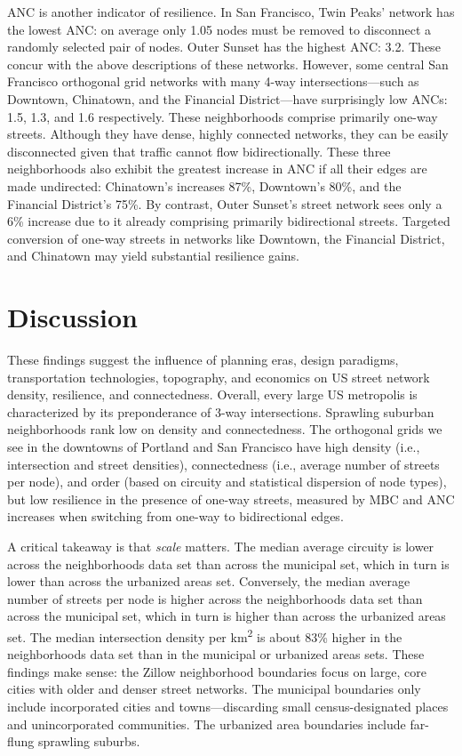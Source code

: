 \documentclass[Afour,sageh,times]{sagej}
\begin{document}
ANC is another indicator of resilience. In San Francisco, Twin Peaks' network has the lowest ANC: on average only 1.05 nodes must be removed to disconnect a randomly selected pair of nodes. Outer Sunset has the highest ANC: 3.2. These concur with the above descriptions of these networks. However, some central San Francisco orthogonal grid networks with many 4-way intersections---such as Downtown, Chinatown, and the Financial District---have surprisingly low ANCs: 1.5, 1.3, and 1.6 respectively. These neighborhoods comprise primarily one-way streets. Although they have dense, highly connected networks, they can be easily disconnected given that traffic cannot flow bidirectionally. These three neighborhoods also exhibit the greatest increase in ANC if all their edges are made undirected: Chinatown's increases 87\%, Downtown's 80\%, and the Financial District's 75\%. By contrast, Outer Sunset's street network sees only a 6\% increase due to it already comprising primarily bidirectional streets. Targeted conversion of one-way streets in networks like Downtown, the Financial District, and Chinatown may yield substantial resilience gains.



\section{Discussion}

These findings suggest the influence of planning eras, design paradigms, transportation technologies, topography, and economics on US street network density, resilience, and connectedness. Overall, every large US metropolis is characterized by its preponderance of 3-way intersections. Sprawling suburban neighborhoods rank low on density and connectedness. The orthogonal grids we see in the downtowns of Portland and San Francisco have high density (i.e., intersection and street densities), connectedness (i.e., average number of streets per node), and order (based on circuity and statistical dispersion of node types), but low resilience in the presence of one-way streets, measured by MBC and ANC increases when switching from one-way to bidirectional edges.

A critical takeaway is that \emph{scale} matters. The median average circuity is lower across the neighborhoods data set than across the municipal set, which in turn is lower than across the urbanized areas set. Conversely, the median average number of streets per node is higher across the neighborhoods data set than across the municipal set, which in turn is higher than across the urbanized areas set. The median intersection density per km\textsuperscript{2} is about 83\% higher in the neighborhoods data set than in the municipal or urbanized areas sets. These findings make sense: the Zillow neighborhood boundaries focus on large, core cities with older and denser street networks. The municipal boundaries only include incorporated cities and towns---discarding small census-designated places and unincorporated communities. The urbanized area boundaries include far-flung sprawling suburbs.
\end{document}
